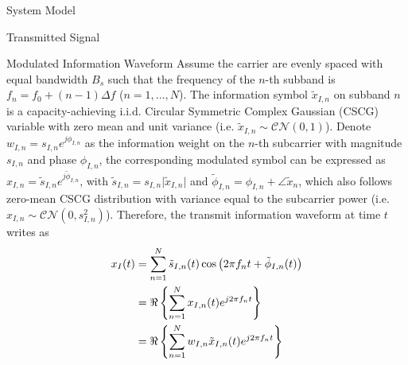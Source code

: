 \documentclass{IEEEtran}
\begin{document}
\begin{section} {System Model}
	\begin{subsection}	{Transmitted Signal}

		\begin{subsubsection} {Modulated Information Waveform}
			Assume the carrier are evenly spaced with equal bandwidth $B_s$ such that the frequency of the $n$-th subband is $f_n = f_0+(n-1) \Delta f$ ($n = 1,\dots,N$). The information symbol $\tilde{x}_{I,n}$ on subband $n$ is a capacity-achieving i.i.d. Circular Symmetric Complex Gaussian (CSCG) variable with zero mean and unit variance (i.e. $\tilde{x}_{I,n} \sim \mathcal{CN}(0,1)$). Denote $w_{I,n} = s_{I,n} e^{j\phi_{I,n}}$ as the information weight on the $n$-th subcarrier with magnitude $s_{I,n}$ and phase $\phi_{I,n}$, the corresponding modulated symbol can be expressed as $x_{I,n} = \tilde{s}_{I,n} e^{j\tilde{\phi}_{I,n}}$, with $\tilde{s}_{I,n} = s_{I,n} \lvert\tilde{x}_{I,n}\rvert$ and $\tilde{\phi}_{I,n} = \phi_{I,n} + \angle{\tilde{x}_n}$, which also follows zero-mean CSCG distribution with variance equal to the subcarrier power (i.e. $x_{I,n} \sim \mathcal{CN}(0,s_{I,n}^2)$). Therefore, the transmit information waveform at time $t$ writes as
			\begin{equation}	\label{eq:x_{I}(t)}
				\begin{split}
					x_{I}(t)
					&= \sum_{n=1}^{N} \tilde{s}_{I,n}(t) \cos \left( 2 \pi f_n t + \tilde{\phi}_{I,n}(t) \right)	\\
					&= \Re \left\{ \sum_{n=1}^{N} x_{I,n}(t) e^{j2 \pi f_n t} \right\}	\\
					&= \Re \left\{ \sum_{n=1}^{N} w_{I,n} \tilde{x}_{I,n}(t) e^{j2 \pi f_n t} \right\}
				\end{split}
			\end{equation}
		\end{subsubsection}


\end{subsection}
\end{section}
\end{document}
